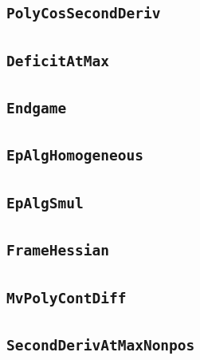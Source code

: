 \documentclass[11pt]{amsart}
\theoremstyle{definition}
\begin{document}
\subsection{\texorpdfstring{\texttt{PolyCosSecondDeriv}}{PolyCosSecondDeriv}}\label{node:PolyCosSecondDeriv}


\subsection{\texorpdfstring{\texttt{DeficitAtMax}}{DeficitAtMax}}\label{node:DeficitAtMax}


\subsection{\texorpdfstring{\texttt{Endgame}}{Endgame}}\label{node:Endgame}


\subsection{\texorpdfstring{\texttt{EpAlgHomogeneous}}{EpAlgHomogeneous}}\label{node:EpAlgHomogeneous}


\subsection{\texorpdfstring{\texttt{EpAlgSmul}}{EpAlgSmul}}\label{node:EpAlgSmul}


\subsection{\texorpdfstring{\texttt{FrameHessian}}{FrameHessian}}\label{node:FrameHessian}


\subsection{\texorpdfstring{\texttt{MvPolyContDiff}}{MvPolyContDiff}}\label{node:MvPolyContDiff}


\subsection{\texorpdfstring{\texttt{SecondDerivAtMaxNonpos}}{SecondDerivAtMaxNonpos}}\label{node:SecondDerivAtMaxNonpos}

\end{document}
